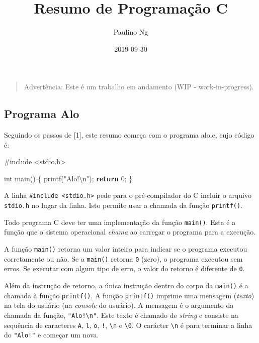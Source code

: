 \documentclass[
]{article}
\title{Resumo de Programação C}
\author{Paulino Ng}
\date{2019-09-30}
\newenvironment{Shaded}{}{}
\newcommand{\ControlFlowTok}[1]{\textcolor[rgb]{0.00,0.44,0.13}{\textbf{#1}}}
\newcommand{\DataTypeTok}[1]{\textcolor[rgb]{0.56,0.13,0.00}{#1}}
\newcommand{\DecValTok}[1]{\textcolor[rgb]{0.25,0.63,0.44}{#1}}
\newcommand{\ImportTok}[1]{#1}
\newcommand{\NormalTok}[1]{#1}
\newcommand{\PreprocessorTok}[1]{\textcolor[rgb]{0.74,0.48,0.00}{#1}}
\newcommand{\SpecialCharTok}[1]{\textcolor[rgb]{0.25,0.44,0.63}{#1}}
\newcommand{\StringTok}[1]{\textcolor[rgb]{0.25,0.44,0.63}{#1}}
\begin{document}
\maketitle

\begin{quote}
Advertência: Este é um trabalho em andamento (WIP - work-in-progress).
\end{quote}

\hypertarget{programa-alo}{%
\subsection{Programa Alo}\label{programa-alo}}

Seguindo os passos de {[}1{]}, este resumo começa com o programa alo.c,
cujo código é:

\begin{Shaded}
\begin{Highlighting}[]
\PreprocessorTok{#include }\ImportTok{<stdio.h>}

\DataTypeTok{int}\NormalTok{ main() \{}
\NormalTok{  printf(}\StringTok{"Alo!}\SpecialCharTok{\textbackslash{}n}\StringTok{"}\NormalTok{);}
  \ControlFlowTok{return} \DecValTok{0}\NormalTok{;}
\NormalTok{\}}
\end{Highlighting}
\end{Shaded}

A linha \texttt{\#include\ \textless{}stdio.h\textgreater{}} pede para o
pré-compilador do C incluir o arquivo \texttt{stdio.h} no lugar da
linha. Isto permite usar a chamada da função \texttt{printf()}.

Todo programa C deve ter uma implementação da função \texttt{main()}.
Esta é a função que o sistema operacional \emph{chama} ao carregar o
programa para a execução.

A função \texttt{main()} retorna um valor inteiro para indicar se o
programa executou corretamente ou não. Se a \texttt{main()} retorna
\texttt{0} (zero), o programa executou sem erros. Se executar com algum
tipo de erro, o valor do retorno é diferente de \texttt{0}.

Além da instrução de retorno, a única instrução dentro do corpo da
\texttt{main()} é a chamada à função \texttt{printf()}. A função
\texttt{printf()} imprime uma mensagem (\emph{texto}) na tela do usuário
(na \emph{console} do usuário). A mensagem é o argumento da chamada da
função, \texttt{"Alo!\textbackslash{}n"}. Este texto é chamado de
\emph{string} e consiste na sequência de caracteres
\texttt{\textquotesingle{}A\textquotesingle{}},
\texttt{\textquotesingle{}l\textquotesingle{}},
\texttt{\textquotesingle{}o\textquotesingle{}},
\texttt{\textquotesingle{}!\textquotesingle{}},
\texttt{\textquotesingle{}\textbackslash{}n\textquotesingle{}} e
\texttt{\textquotesingle{}\textbackslash{}0\textquotesingle{}}. O
carácter \texttt{\textquotesingle{}\textbackslash{}n\textquotesingle{}}
é para terminar a linha do \texttt{"Alo!"} e começar um nova.
\end{document}
